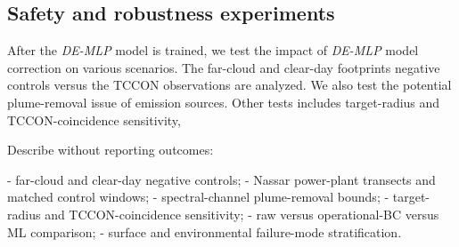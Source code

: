 \subsection{Safety and robustness experiments}
\label{sec:method-safety-exp}


After the \emph{DE-MLP} model is trained, we test the impact of \emph{DE-MLP} model correction on various scenarios. The far-cloud and clear-day footprints negative controls versus the TCCON observations are analyzed. We also test the potential plume-removal issue of emission sources. Other tests includes target-radius and TCCON-coincidence sensitivity, 

Describe without reporting outcomes:

- far-cloud and clear-day negative controls;
- Nassar power-plant transects and matched control windows;
- spectral-channel plume-removal bounds;
- target-radius and TCCON-coincidence sensitivity;
- raw versus operational-BC versus ML comparison;
- surface and environmental failure-mode stratification.
